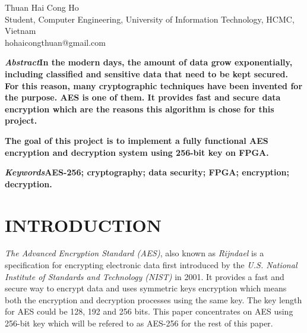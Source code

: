 \documentclass[a4paper, 10pt]{paper}
\begin{document}
    \title{}
    \author{}
    \maketitle %

    \begin{center}
        Thuan Hai Cong Ho\\
        Student, Computer Engineering, University of Information Technology, HCMC, Vietnam\\
        hohaicongthuan@gmail.com
    \end{center}
    \begin{multicols}{2}
        
        \textbf{\textit{Abstract\textemdash}In the modern days, the amount of data grow exponentially, including classified and sensitive data that need to be kept secured. For this reason, many cryptographic techniques have been invented for the purpose. AES is one of them. It provides fast and secure data encryption which are the reasons this algorithm is chose for this project.}

        \textbf{The goal of this project is to implement a fully functional AES encryption and decryption system using 256-bit key on FPGA.}
        
        \bigskip

        \textbf{\textit{Keywords\textemdash}AES-256; cryptography; data security; FPGA; encryption; decryption.}

        \section{INTRODUCTION}
            \textit{The Advanced Encryption Standard (AES)}, also known as \textit{Rijndael} is a specification for encrypting electronic data first introduced by the \textit{U.S. National Institute of Standards and Technology (NIST)} in 2001. It provides a fast and secure way to encrypt data and uses symmetric keys encryption which means both the encryption and decryption processes using the same key. The key length for AES could be 128, 192 and 256 bits. This paper concentrates on AES using 256-bit key which will be refered to as AES-256 for the rest of this paper.


\end{multicols}
\end{document}
